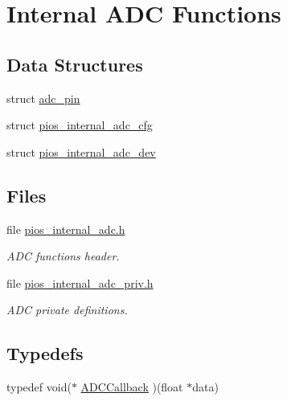 \hypertarget{group___p_i_o_s___i_n_t_e_r_n_a_l___a_d_c}{\section{\-Internal \-A\-D\-C \-Functions}
\label{group___p_i_o_s___i_n_t_e_r_n_a_l___a_d_c}
}
\subsection*{\-Data \-Structures}
\begin{DoxyCompactItemize}
\item 
struct \hyperlink{structadc__pin}{adc\-\_\-pin}
\item 
struct \hyperlink{structpios__internal__adc__cfg}{pios\-\_\-internal\-\_\-adc\-\_\-cfg}
\item 
struct \hyperlink{structpios__internal__adc__dev}{pios\-\_\-internal\-\_\-adc\-\_\-dev}
\end{DoxyCompactItemize}
\subsection*{\-Files}
\begin{DoxyCompactItemize}
\item 
file \hyperlink{pios__internal__adc_8h}{pios\-\_\-internal\-\_\-adc.\-h}
\begin{DoxyCompactList}\small\item\em \-A\-D\-C functions header. \end{DoxyCompactList}\item 
file \hyperlink{pios__internal__adc__priv_8h}{pios\-\_\-internal\-\_\-adc\-\_\-priv.\-h}
\begin{DoxyCompactList}\small\item\em \-A\-D\-C private definitions. \end{DoxyCompactList}\end{DoxyCompactItemize}
\subsection*{\-Typedefs}
\begin{DoxyCompactItemize}
\item 
typedef void($\ast$ \hyperlink{group___p_i_o_s___i_n_t_e_r_n_a_l___a_d_c_ga20bf90833813c2c4945fab90c8e4f386}{\-A\-D\-C\-Callback} )(float $\ast$data)
\end{DoxyCompactItemize}
